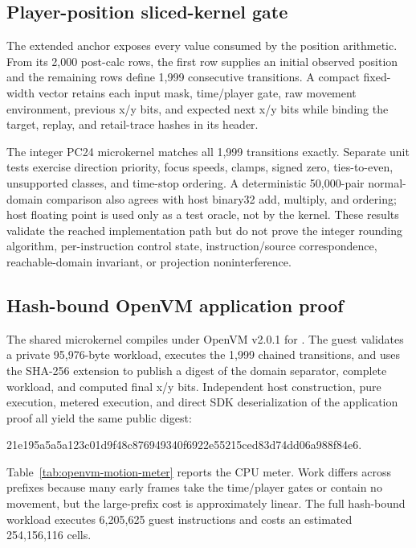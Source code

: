 \subsection{Player-position sliced-kernel gate}

The extended anchor exposes every value consumed by the position arithmetic.
From its 2,000 post-calc rows, the first row supplies an initial observed
position and the remaining rows define 1,999 consecutive transitions.  A
compact fixed-width vector retains each input mask, time/player gate, raw
movement environment, previous x/y bits, and expected next x/y bits while
binding the target, replay, and retail-trace hashes in its header.

The integer PC24 microkernel matches all 1,999 transitions exactly.  Separate
unit tests exercise direction priority, focus speeds, clamps, signed zero,
ties-to-even, unsupported classes, and time-stop ordering.  A deterministic
50,000-pair normal-domain comparison also agrees with host binary32 add,
multiply, and ordering; host floating point is used only as a test oracle, not
by the kernel.  These results validate the reached implementation path but do
not prove the integer rounding algorithm, per-instruction control state,
instruction/source correspondence, reachable-domain invariant, or projection
noninterference.

\subsection{Hash-bound OpenVM application proof}

The shared microkernel compiles under OpenVM v2.0.1 for
.  The guest validates a private 95,976-byte
workload, executes the 1,999 chained transitions, and uses the SHA-256 extension
to publish a digest of the domain separator, complete workload, and computed
final x/y bits.  Independent host construction, pure execution, metered
execution, and direct SDK deserialization of the application proof all yield
the same public digest:
\begin{center}
\small\ttfamily
21e195a5a5a123c01d9f48c876949340f6922e55215ced83d74dd06a988f84e6.
\end{center}

Table~\ref{tab:openvm-motion-meter} reports the CPU meter.  Work differs across
prefixes because many early frames take the time/player gates or contain no
movement, but the large-prefix cost is approximately linear.  The full
hash-bound workload executes 6,205,625 guest instructions and costs an
estimated 254,156,116 cells.

